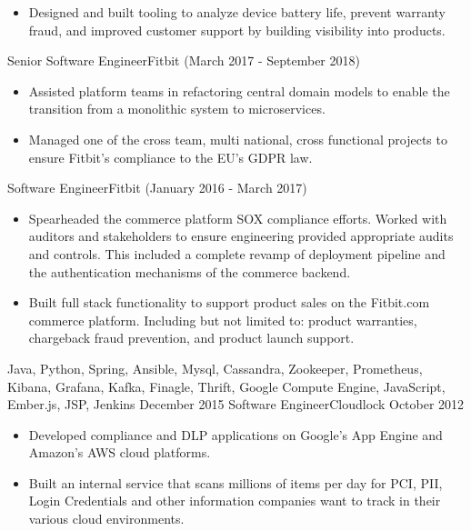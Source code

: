 \begin{experiences}
{\begin{itemize}
                        \item Designed and built tooling to analyze device battery life, prevent warranty fraud, and improved customer support by building visibility into products.
                      \end{itemize}
                  }
                  {}
  \experience
  {}  {Senior Software Engineer}{Fitbit {\footnotesize (March 2017 - September 2018)}}
  {}   {
                      \begin{itemize}
                        \item Assisted platform teams in refactoring central domain models to enable the transition from a monolithic system to microservices.
                        \item Managed one of the cross team, multi national, cross functional projects to ensure Fitbit’s compliance to the EU’s GDPR law.
                      \end{itemize}
                  }
                  {}
   \experience
  {}  {Software Engineer}{Fitbit {\footnotesize (January 2016 - March 2017)}}
  {}   {
                      \begin{itemize}
                        \item Spearheaded the commerce platform SOX compliance efforts. Worked with auditors and stakeholders to ensure engineering provided appropriate audits and controls. This included a complete revamp of deployment pipeline and the authentication mechanisms of the commerce backend.
                        \item Built full stack functionality to support product sales on the Fitbit.com commerce platform. Including but not limited to: product warranties, chargeback fraud prevention, and product launch support.
                      \end{itemize}
                  }
                  {Java, Python, Spring, Ansible, Mysql, Cassandra, Zookeeper, Prometheus, Kibana, Grafana, Kafka, Finagle, Thrift, Google Compute Engine, JavaScript, Ember.js, JSP, Jenkins}
\emptySeparator
  \experience
  {December 2015}  {Software Engineer}{Cloudlock}
  {October 2012}   {
                      \begin{itemize}
                        \item Developed compliance and DLP applications on Google's App Engine and Amazon's AWS cloud platforms.
                        \item Built an internal service that scans millions of items per day for PCI, PII, Login Credentials and other information companies want to track in their various cloud environments.

\end{itemize}}
\end{experiences}

